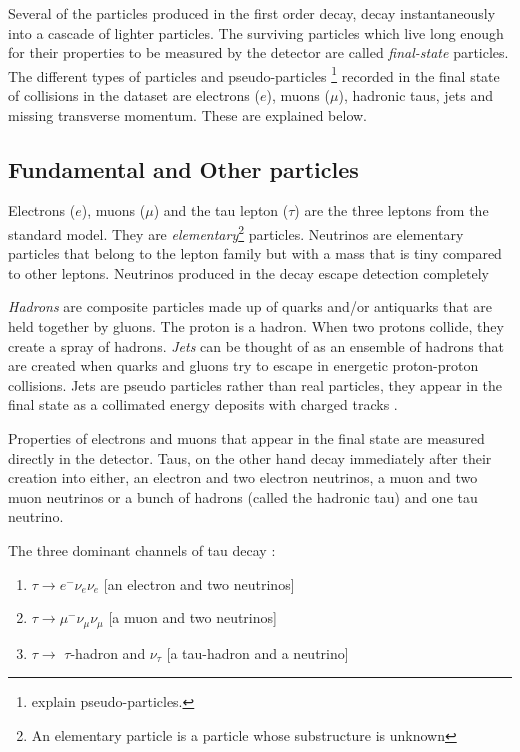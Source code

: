\documentclass[final,3p,times,twocolumn]{elsarticle}
\begin{document}
Several of the particles produced in the first order decay, decay instantaneously into a cascade of lighter particles. The surviving particles which live long enough for their properties to be measured by the detector are called \textit{final-state} particles. The different types of particles and pseudo-particles \footnote{explain pseudo-particles.} recorded in the final state of collisions in the dataset are electrons ($e$), muons ($\mu$), hadronic taus, jets and missing transverse momentum. These are explained below. 

\subsection{Fundamental and Other particles}

Electrons ($e$), muons ($\mu$) and the tau lepton ($\tau$) are the three leptons from the standard model. They are \textit{elementary}\footnote{An elementary particle is a particle whose substructure is unknown} particles. Neutrinos are elementary particles that belong to the lepton family but with a mass that is tiny compared to other leptons. Neutrinos produced in the decay escape detection completely 

\textit{Hadrons} are composite particles made up of quarks and/or antiquarks that are held together by gluons. The proton is a hadron. When two protons collide, they create a spray of hadrons. \textit{Jets} can be thought of as an ensemble of hadrons that are created when quarks and gluons try to escape in energetic proton-proton collisions. Jets are pseudo particles rather than real particles, they appear in the final state as a collimated energy deposits with charged tracks \cite{CMS:2} \cite{RM}. 

Properties of electrons and muons that appear in the final state are measured directly in the detector. Taus, on the other hand decay immediately after their creation into either, an electron and two electron neutrinos, a muon and two muon neutrinos or a bunch of hadrons (called the hadronic tau) and one tau neutrino. 

The three dominant channels of tau decay :

\begin{enumerate}[noitemsep]
\item{$\tau \rightarrow e^{-}\nu_{e}\nu_{e}$} [an electron and two neutrinos]
\item{$\tau \rightarrow \mu^{-}\nu_{\mu}\nu_{\mu}$} [a muon and two neutrinos]
\item{$\tau \rightarrow$  $\tau$-hadron and $\nu_{\tau}$ [a tau-hadron and a neutrino]}
\end{enumerate} 
\end{document}
